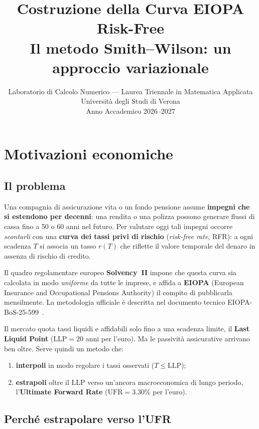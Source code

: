 \documentclass[11pt,a4paper]{article}
\title{%
  \textbf{Costruzione della Curva EIOPA Risk-Free}\\[6pt]
  \large Il metodo Smith--Wilson: un approccio variazionale\\[4pt]
}
\author{Laboratorio di Calcolo Numerico --- Laurea Triennale in Matematica Applicata\\
  Universit\`a degli Studi di Verona\\[2pt]
  Anno Accademico 2026--2027}
\date{}
\theoremstyle{plain}
\theoremstyle{definition}
\theoremstyle{remark}
\newcommand{\UFR}{\ensuremath{\mathrm{UFR}}}
\newcommand{\LLP}{\ensuremath{\mathrm{LLP}}}
\begin{document}
\maketitle
\tableofcontents
\newpage

\section{Motivazioni economiche}

\subsection{Il problema}

Una compagnia di assicurazione vita o un fondo pensione assume \textbf{impegni che si
estendono per decenni}: una rendita o una polizza possono generare flussi di cassa fino a
50 o 60 anni nel futuro. Per valutare oggi tali impegni occorre \emph{scontarli} con una
\textbf{curva dei tassi privi di rischio} (\emph{risk-free rate}, RFR): a ogni scadenza $T$
si associa un tasso $r(T)$ che riflette il valore temporale del denaro in assenza di rischio
di credito.

Il quadro regolamentare europeo \textbf{Solvency~II} impone che questa curva sia calcolata
in modo \emph{uniforme} da tutte le imprese, e affida a \textbf{EIOPA} (European Insurance and
Occupational Pensions Authority) il compito di pubblicarla mensilmente. La metodologia
ufficiale \`e descritta nel documento tecnico EIOPA-BoS-25-599~\cite{eiopa2025}.

\begin{keybox}
Il mercato quota tassi liquidi e affidabili solo fino a una scadenza limite, il
\textbf{Last Liquid Point} ($\LLP = 20$ anni per l'euro). Ma le passivit\`a assicurative
arrivano ben oltre. Serve quindi un metodo che:
\begin{enumerate}
  \item \textbf{interpoli} in modo regolare i tassi osservati ($T \le \LLP$);
  \item \textbf{estrapoli} oltre il $\LLP$ verso un'ancora macroeconomica di lungo periodo,
        l'\textbf{Ultimate Forward Rate} ($\UFR = 3.30\%$ per l'euro).
\end{enumerate}
\end{keybox}

\subsection{Perch\'e estrapolare verso l'UFR}
\end{document}
